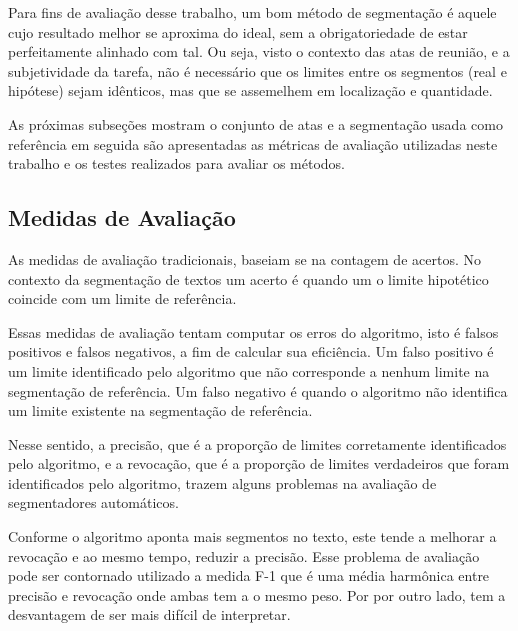 Para fins de avaliação desse trabalho, um bom método de segmentação é aquele cujo resultado melhor se aproxima do ideal, sem a obrigatoriedade de estar perfeitamente alinhado com tal. Ou seja, visto o contexto das atas de reunião, e a subjetividade da tarefa, não é necessário que os limites entre os segmentos (real e hipótese) sejam idênticos, mas que se assemelhem em localização e quantidade.




As próximas subseções mostram o conjunto de atas e a segmentação usada como referência em seguida são apresentadas as métricas de avaliação utilizadas neste trabalho e os testes realizados para avaliar os métodos.


	


\subsection{Medidas de Avaliação}


As medidas de avaliação tradicionais, baseiam se na contagem de acertos. No contexto da segmentação de textos um acerto é quando um o limite hipotético coincide com um limite de referência.

Essas medidas de avaliação tentam computar os erros do algoritmo, isto é falsos positivos e falsos negativos, a fim de calcular sua eficiência. 
%
Um falso positivo é um limite identificado pelo algoritmo que não corresponde a nenhum limite na segmentação de referência. 
%
Um falso negativo é quando o algoritmo não identifica um limite existente na segmentação de referência.


Nesse sentido, 
%
a precisão, que é a proporção de limites corretamente identificados pelo algoritmo, e 
%
a revocação, que é a proporção de limites verdadeiros que foram identificados pelo algoritmo,
%
trazem alguns problemas na avaliação de segmentadores automáticos.
 	
	
Conforme o algoritmo aponta mais segmentos no texto, este tende a melhorar a revocação e ao mesmo tempo, reduzir a precisão. Esse problema de avaliação pode ser contornado utilizado a medida F-1 que é uma média harmônica entre precisão e revocação onde ambas tem a o mesmo peso. Por por outro lado, tem a desvantagem de ser mais difícil de interpretar. 

